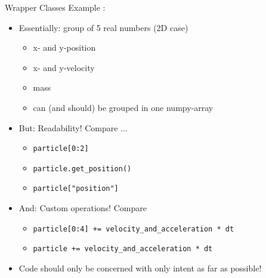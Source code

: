 \begin{frame}{Wrapper Classes}
%
Example :
\begin{itemize}
\item Essentially: group of 5 real numbers (2D case)
	\begin{itemize}
	\item x- and y-position
	\item x- and y-velocity
	\item mass
	\item[\Thus] can (and should) be grouped in one numpy-array
	\end{itemize}
\item But: Readability! Compare ...
	\begin{itemize}
	\item \texttt{particle[0:2]}
	\item \texttt{particle.get\_position()}
	\item \texttt{particle["position"]}
	\end{itemize}
\item And: Custom operations! Compare
	\begin{itemize}
	\item \texttt{particle[0:4] += velocity\_and\_acceleration * dt}
	\item \texttt{particle += velocity\_and\_acceleration * dt}
	\end{itemize}
\item[\Thus] Code should only be concerned with only intent as far as possible!
\end{itemize}
%
\end{frame}


